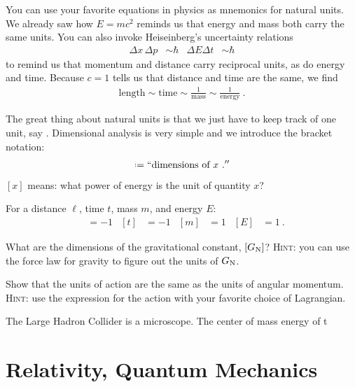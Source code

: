 \documentclass[12pt, oneside]{report}    %
\begin{document}
\begin{example}[Mnemonics]
You can use your favorite equations in physics as mnemonics for natural units. We already saw how $E=mc^2$ reminds us that energy and mass both carry the same units. You can also invoke Heiseinberg's uncertainty relations
\begin{align}
    \Delta x\,\Delta p &\sim \hbar 
    &
    \Delta E \Delta t &\sim \hbar
\end{align}
to remind us that momentum and distance carry reciprocal units, as do energy and time. Because $c=1$ tells us that distance and time are the same, we find
\begin{align}
    \text{length} \sim \text{time} \sim \frac{1}{\text{mass}} 
    \sim \frac{1}{\text{energy}} \ .
\end{align}
\end{example}

The great thing about natural units is that we just have to keep track of one unit, say \GeV{}. Dimensional analysis is very simple and we introduce the bracket notation:
\begin{align}
    [x] \defeq ``\text{dimensions of }x \ .''
\end{align}
$[x]$ means: what power of energy is the unit of quantity $x$?
\begin{example}
For a distance $\ell$, time $t$, mass $m$, and energy $E$:
\begin{align}
    [\ell] &= -1
    &
    [t] &= -1
    &
    [m] &= 1
    &
    [E] &= 1
    \ .
\end{align}
\end{example}
\begin{exercise}
What are the dimensions of the gravitational constant, $[G_\textnormal{N}]$? \textsc{Hint}: you can use the force law for gravity to figure out the  units of $G_\textnormal{N}$.
\end{exercise}

\begin{exercise}
Show that the units of action are the same as the units of angular momentum. \textsc{Hint}: use the expression for the action with your favorite choice of Lagrangian.
\end{exercise}

\begin{example}
The Large Hadron Collider is a microscope. The center of mass energy of t
\end{example}

\chapter{Relativity, Quantum Mechanics}
\end{document}

